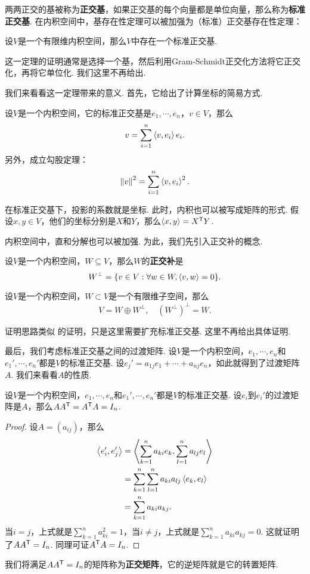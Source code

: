 两两正交的基被称为\textbf{正交基}，如果正交基的每个向量都是单位向量，那么称为\textbf{标准正交基}. 在内积空间中，基存在性定理可以被加强为（标准）正交基存在性定理：

\begin{theorem}[标准正交基存在性定理]\label{thm:orthogonal-basis}
设$V$是一个有限维内积空间，那么$V$中存在一个标准正交基. 
\end{theorem}
这一定理的证明通常是选择一个基，然后利用Gram-Schmidt正交化方法将它正交化，再将它单位化. 我们这里不再给出. 

我们来看看这一定理带来的意义. 首先，它给出了计算坐标的简易方式. 

\begin{proposition}\label{prop:projection}
设$V$是一个内积空间，它的标准正交基是$e_1,\cdots,e_n$，$v\in V$，那么
\[
    v=\sum_{i=1}^n\left\langle{v},{e_i}\right\rangle e_i.
\]
另外，成立勾股定理：
\[
    \left\|v\right\|^2=\sum_{i=1}^n\left\langle{v},{e_i}\right\rangle^2.
\]
\end{proposition}
在标准正交基下，投影的系数就是坐标. 此时，内积也可以被写成矩阵的形式. 假设$x,y\in V$，他们的坐标分别是$X$和$Y$，那么$\left\langle{x},{y}\right\rangle=X^{\mathsf{T}} Y$.

内积空间中，直和分解也可以被加强. 为此，我们先引入正交补的概念. 

\begin{definition}[正交补]\label{def:orthogonal-complement}
设$V$是一个内积空间，$W\subseteq V$，那么$W$的\textbf{正交补}是
\[
    W^\bot=\{v\in V:\forall w\in W,\left\langle{v},{w}\right\rangle=0\}.
\]
\end{definition}

\begin{theorem}\label{prop:orthogonal-complement}
设$V$是一个内积空间，$W\subset V$是一个有限维子空间，那么
\[
    V=W\oplus W^\bot,\quad (W^\bot)^\bot=W.
\]
\end{theorem}
证明思路类似 的证明，只是这里需要扩充标准正交基. 这里不再给出具体证明. 

最后，我们考虑标准正交基之间的过渡矩阵. 设$V$是一个内积空间，$e_1,\cdots,e_n$和$e_1',\cdots,e_n'$都是$V$的标准正交基. 设$e_j'=a_{1j}e_1+\cdots+a_{nj}e_n$，如此就得到了过渡矩阵$A$. 我们来看看$A$的性质. 

\begin{proposition}
设$V$是一个内积空间，$e_1,\cdots,e_n$和$e_1',\cdots,e_n'$都是$V$的标准正交基. 设$e_i$到$e_i'$的过渡矩阵是$A$，那么$AA^{\mathsf{T}}=A^{\mathsf{T}} A=I_n$.
\end{proposition}
\begin{proof}
设$A=(a_{ij})$，那么
\begin{align*}
    \left\langle{e_i'},{e_j'}\right\rangle&=\left\langle{\sum_{k=1}^na_{ki}e_k},{\sum_{l=1}^na_{lj}e_l}\right\rangle \\
    &=\sum_{k=1}^n\sum_{l=1}^na_{ki}a_{lj}\left\langle{e_k},{e_l}\right\rangle \\
    &=\sum_{k=1}^na_{ki}a_{kj}.
\end{align*}
当$i=j$，上式就是$\sum_{k=1}^na_{ki}^2=1$，当$i\neq j$，上式就是$\sum_{k=1}^na_{ki}a_{kj}=0$. 这就证明了$AA^{\mathsf{T}}=I_n$. 同理可证$A^{\mathsf{T}} A=I_n$.
\end{proof}
我们将满足$AA^{\mathsf{T}}=I_n$的矩阵称为\textbf{正交矩阵}，它的逆矩阵就是它的转置矩阵. 

